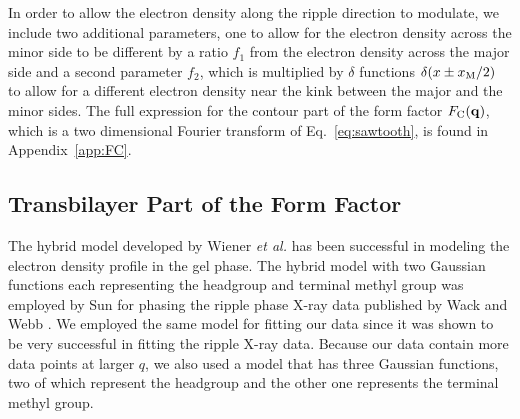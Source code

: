 In order to allow the electron density along the ripple direction to 
modulate, we include two additional parameters, one to allow for the electron
density across the minor side to be different by a ratio $f_1$ from the 
electron density across the major side and a second parameter $f_2$, which
is multiplied by $\delta$ functions $\delta(x \pm x_\textrm{M}/2)$ to allow for 
a different electron density near the kink between the major and the minor
sides. The full expression for the contour part of the form factor $F_\mathrm{C}(\mathbf{q})$,
which is a two dimensional Fourier transform of Eq.~\ref{eq:sawtooth},
is found in Appendix~\ref{app:FC}.

\subsection{Transbilayer Part of the Form Factor}\label{sec:transbilayer}
The hybrid model developed by Wiener \textit{et al.} \cite{ref:Wiener89} has
been successful in modeling the electron density profile in the gel phase.
The hybrid model with two Gaussian functions each representing the headgroup and
terminal methyl group was employed by Sun  \cite{ref:Sun96}
for phasing the ripple phase X-ray data published by Wack and Webb \cite{ref:Wack89}.
We employed the same model for fitting our data 
since it was shown to be very successful in fitting the ripple X-ray data.
Because our data contain more data points at larger $q$, we also used
a model that has three  Gaussian functions, two of which represent the headgroup 
and the other one represents the terminal methyl group. 

